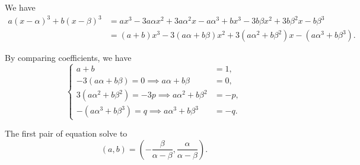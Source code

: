 \Question{\currfilebase}

We have
\begin{align*}
    a(x - \alpha)^3 + b(x - \beta)^3 & = ax^3 - 3a\alpha x^2 + 3a\alpha^2 x - a\alpha^3 + bx^3 - 3b\beta x^2 + 3b\beta^2 x - b\beta^3 \\
                                     & = (a + b)x^3 - 3(a\alpha + b\beta) x^2 + 3 (a\alpha^2 + b\beta^2) x - (a\alpha^3 + b\beta^3).
\end{align*}

By comparing coefficients, we have
\[
    \left\{
    \begin{aligned}
        a + b                                                        & = 1,  \\
        -3 (a\alpha + b\beta) = 0 \implies a\alpha + b\beta          & = 0,  \\
        3 (a\alpha^2 + b\beta^2) = -3p \implies a\alpha^2 + b\beta^2 & = -p, \\
        -(a\alpha^3 + b\beta^3) = q \implies a\alpha^3 + b\beta^3    & = -q.
    \end{aligned}
    \right.
\]

The first pair of equation solve to
\[
    (a, b) = \left(-\frac{\beta}{\alpha - \beta}, \frac{\alpha}{\alpha - \beta}\right).
\]

